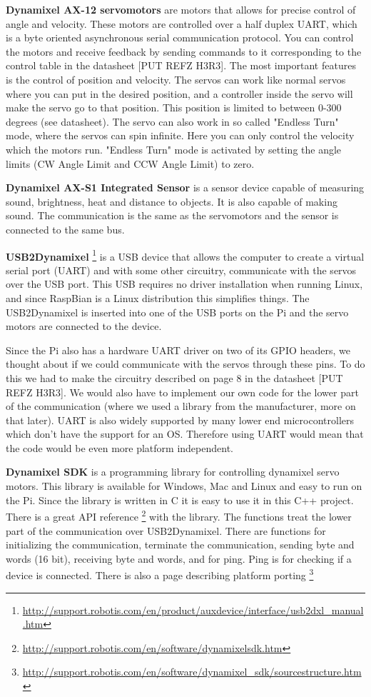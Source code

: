 \textbf{Dynamixel AX-12 servomotors}
are motors that allows for precise control of angle and velocity. These motors are controlled over a half duplex UART, which is a byte oriented asynchronous serial communication protocol. You can control the motors and receive feedback by sending commands to it corresponding to the control table in the datasheet [PUT REFZ H3R3]. The most important features is the control of position and velocity. The servos can work like normal servos where you can put in the desired position, and a controller inside the servo will make the servo go to that position. This position is limited to between 0-300 degrees (see datasheet). The servo can also work in so called "Endless Turn" mode, where the servos can spin infinite. Here you can only control the velocity which the motors run. "Endless Turn" mode is activated by setting the angle limits (CW Angle Limit and CCW Angle Limit) to zero.
\bigskip

\textbf{Dynamixel AX-S1 Integrated Sensor}
is a sensor device capable of measuring sound, brightness, heat and distance to objects. It is also capable of making sound. The communication is the same as the servomotors and the sensor is connected to the same bus. 
\bigskip

\textbf{USB2Dynamixel} \footnote{\url{http://support.robotis.com/en/product/auxdevice/interface/usb2dxl_manual.htm}} is a USB device that allows the computer to create a virtual serial port (UART) and with some other circuitry, communicate with the servos over the USB port.
This USB requires no driver installation when running Linux, and since RaspBian is a Linux distribution this simplifies things. 
The USB2Dynamixel is inserted into one of the USB ports on the Pi and the servo motors are connected to the device.

Since the Pi also has a hardware UART driver on two of its GPIO headers, we thought about if we could communicate with the servos through these pins. 
To do this we had to make the circuitry described on page 8 in the datasheet [PUT REFZ H3R3]. 
We would also have to implement our own code for the lower part of the communication (where we used a library from the manufacturer, more on that later).
UART is also widely supported by many lower end microcontrollers which don't have the support for an OS. 
Therefore using UART would mean that the code would be even more platform independent.
\bigskip

\textbf{Dynamixel SDK} is a programming library for controlling dynamixel servo motors. 
This library is available for Windows, Mac and Linux and easy to run on the Pi. 
Since the library is written in C it is easy to use it in this C++ project.
There is a great API reference \footnote{\url{http://support.robotis.com/en/software/dynamixelsdk.htm}} with the library.
The functions treat the lower part of the communication over USB2Dynamixel.
There are functions for initializing the communication, terminate the communication, sending byte and words (16 bit), receiving byte and words, and for ping. Ping is for checking if a device is connected.
There is also a page describing platform porting \footnote{\url{http://support.robotis.com/en/software/dynamixel_sdk/sourcestructure.htm}}


